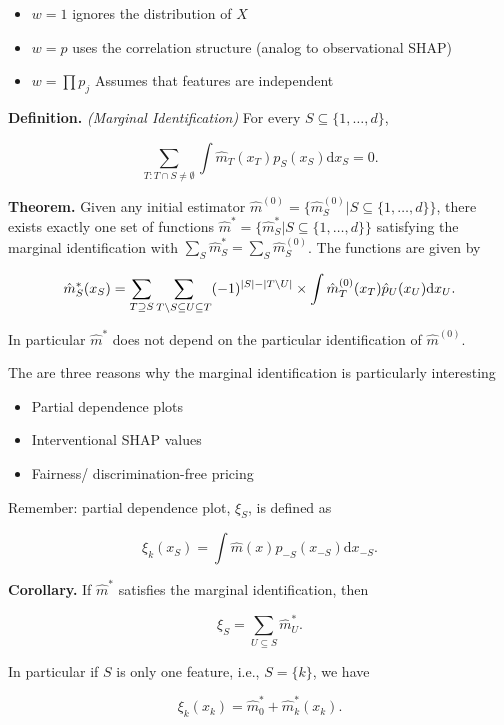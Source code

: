 \documentclass[a4paper,12pt,openany]{book}
\providecommand{\tightlist}{%
 \setlength{\itemsep}{0pt}\setlength{\parskip}{0pt}}
\begin{document}
\begin{itemize}
\tightlist
\item
  \(w=1\) ignores the distribution of \(X\)
\item
  \(w=p\) uses the correlation structure (analog to observational SHAP)
\item
  \(w=\prod p_j\) Assumes that features are independent
\end{itemize}

\textbf{Definition.} \emph{(Marginal Identification)} For every \(S\subseteq \{1,\dots,d\}\),

\[
\sum_{T: T \cap S \neq \emptyset} \int  \hat m_T(x_T)  p_{S}(x_{S}) \mathrm dx_S=0.
\]

\textbf{Theorem.} Given any initial estimator \(\hat m^{(0)}=\{\hat m^{(0)}_S | S\subseteq \{1,\dots,d\}\}\),
there exists exactly one set of functions \(\hat m^\ast=\{\hat m^\ast_S | S\subseteq \{1,\dots,d\}\}\) satisfying the marginal identification with \(\sum_S \hat m^\ast_S = \sum_S \hat m^{(0)}_S\).
The functions are given by

\[
\hat m^\ast_S (x_S)=  \sum_{T \supseteq S} \sum_{T\setminus S \subseteq U\subseteq  T}(-1)^{|S|-|T\setminus U|} \times \int \hat m^{(0)}_T(x_T) \hat p_U(x_U)\mathrm dx_U. \notag
\]

In particular \(\hat m^\ast\) does not depend on the particular identification of \(\hat m^{(0)}\).

The are three reasons why the marginal identification is particularly interesting

\begin{itemize}
\tightlist
\item
  Partial dependence plots
\item
  Interventional SHAP values
\item
  Fairness/ discrimination-free pricing
\end{itemize}

Remember: partial dependence plot, \(\xi_S\), is defined as

\[
\xi_k(x_S)= \int \hat m(x) p_{-S}(x_{-S})\mathrm dx_{-S}.
\]

\textbf{Corollary.} If \(\hat m^{\ast}\) satisfies the marginal identification, then

\[
\xi_S=\sum_{U \subseteq S} \hat m_U^{\ast}.
\]

In particular if \(S\) is only one feature, i.e., \(S=\{k\}\), we have

\[
\xi_k(x_k)= \hat m_0^{\ast} + \hat m_k^\ast(x_k).
\]
\end{document}
